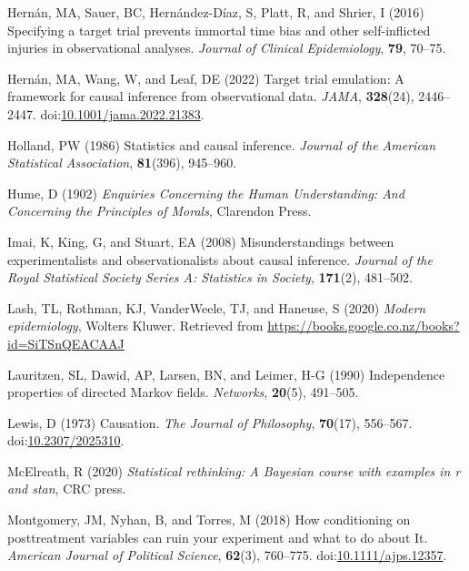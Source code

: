\documentclass[
  single column]{article}
\newlength{\cslhangindent}
\newenvironment{CSLReferences}[2] %
 {\begin{list}{}{%
  \setlength{\itemindent}{0pt}
  \setlength{\leftmargin}{0pt}
  \setlength{\parsep}{0pt}
  \ifodd #1
   \setlength{\leftmargin}{\cslhangindent}
   \setlength{\itemindent}{-1\cslhangindent}
  \fi
  \setlength{\itemsep}{#2\baselineskip}}}
 {\end{list}}
\begin{document}
\begin{CSLReferences}{1}{0}
Hernán, MA, Sauer, BC, Hernández-Díaz, S, Platt, R, and Shrier, I (2016)
Specifying a target trial prevents immortal time bias and other
self-inflicted injuries in observational analyses. \emph{Journal of
Clinical Epidemiology}, \textbf{79}, 70--75.

Hernán, MA, Wang, W, and Leaf, DE (2022) Target trial emulation: A
framework for causal inference from observational data. \emph{JAMA},
\textbf{328}(24), 2446--2447.
doi:\href{https://doi.org/10.1001/jama.2022.21383}{10.1001/jama.2022.21383}.

Holland, PW (1986) Statistics and causal inference. \emph{Journal of the
American Statistical Association}, \textbf{81}(396), 945--960.

Hume, D (1902) \emph{Enquiries Concerning the Human Understanding: And
Concerning the Principles of Morals}, Clarendon Press.

Imai, K, King, G, and Stuart, EA (2008) Misunderstandings between
experimentalists and observationalists about causal inference.
\emph{Journal of the Royal Statistical Society Series A: Statistics in
Society}, \textbf{171}(2), 481--502.

Lash, TL, Rothman, KJ, VanderWeele, TJ, and Haneuse, S (2020)
\emph{Modern epidemiology}, Wolters Kluwer. Retrieved from
\url{https://books.google.co.nz/books?id=SiTSnQEACAAJ}

Lauritzen, SL, Dawid, AP, Larsen, BN, and Leimer, H-G (1990)
Independence properties of directed {M}arkov fields. \emph{Networks},
\textbf{20}(5), 491--505.

Lewis, D (1973) Causation. \emph{The Journal of Philosophy},
\textbf{70}(17), 556--567.
doi:\href{https://doi.org/10.2307/2025310}{10.2307/2025310}.

McElreath, R (2020) \emph{Statistical rethinking: A {B}ayesian course
with examples in r and stan}, CRC press.

Montgomery, JM, Nyhan, B, and Torres, M (2018) How conditioning on
posttreatment variables can ruin your experiment and what to do about
It. \emph{American Journal of Political Science}, \textbf{62}(3),
760--775.
doi:\href{https://doi.org/10.1111/ajps.12357}{10.1111/ajps.12357}.


\end{CSLReferences}
\end{document}
